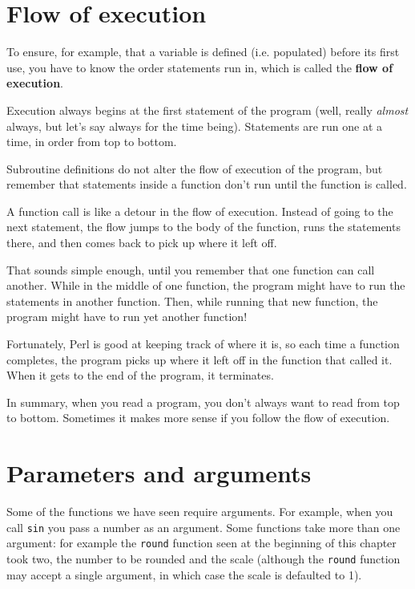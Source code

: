 \section{Flow of execution}

To ensure, for example, that a variable is defined (i.e. populated) 
before its first use, you have to know the order statements run in, 
which is called the {\bf flow of execution}.

Execution always begins at the first statement of the program 
(well, really \emph{almost} always, but let's say always 
for the time being). Statements are run one at a time, 
in order from top to bottom.

Subroutine definitions do not alter the flow of execution of the
program, but remember that statements inside a function don't
run until the function is called.

A function call is like a detour in the flow of execution. Instead of
going to the next statement, the flow jumps to the body of
the function, runs the statements there, and then comes back
to pick up where it left off.

That sounds simple enough, until you remember that one function can
call another.  While in the middle of one function, the program might
have to run the statements in another function.  Then, while
running that new function, the program might have to run yet
another function!

Fortunately, Perl is good at keeping track of where it is, so each
time a function completes, the program picks up where it left off in
the function that called it.  When it gets to the end of the program,
it terminates.

In summary, when you read a program, you
don't always want to read from top to bottom.  Sometimes it makes
more sense if you follow the flow of execution.


\section{Parameters and arguments}
\label{parameters}

Some of the functions we have seen require arguments.  For
example, when you call {\tt sin} you pass a number
as an argument.  Some functions take more than one argument:
for example the {\tt round} function seen at the beginning 
of this chapter took two, the number to be rounded and 
the scale (although the {\tt round} function may accept a single argument, in which case the scale is defaulted to 1).


